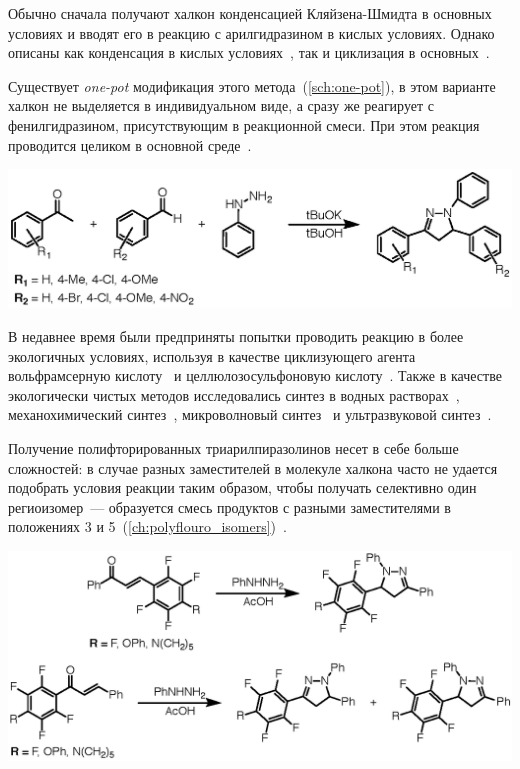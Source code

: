 Обычно сначала получают халкон конденсацией Кляйзена-Шмидта в основных условиях и вводят его в реакцию с арилгидразином в кислых условиях.
Однако описаны как конденсация в кислых условиях~\cite{Wang2010, Nielsen}, так и циклизация в основных~\cite{Munawar2008, Neudorfer2014, Manyem2007, Patel2004, Singh2014}.

Существует \emph{one-pot} модификация этого метода~(\ref{sch:one-pot}), в этом варианте халкон не выделяется в индивидуальном виде, а сразу же реагирует с фенилгидразином, присутствующим в реакционной смеси.
При этом реакция проводится целиком в основной среде~\cite{Farooq2020}.

\begin{scheme}[h!]
    \centering
    \includegraphics{sections/literature/img/one-pot.eps}
    \caption{}
    \label{sch:one-pot}
\end{scheme}

В недавнее время были предприняты попытки проводить реакцию в более экологичных условиях, используя в качестве циклизующего агента вольфрамсерную кислоту~\cite{Rahmatzadeh2015} и целлюлозосульфоновую кислоту~\cite{Daneshfar2015}.
Также в качестве экологически чистых методов исследовались синтез в водных растворах~\cite{Markovic2015}, механохимический синтез~\cite{Zangade2013}, микроволновый синтез~\cite{Adhikari2012} и ультразвуковой синтез~\cite{Shelke2012}.

Получение полифторированных триарилпиразолинов несет в себе больше сложностей: в случае разных заместителей в молекуле халкона часто не удается подобрать условия реакции таким образом, чтобы получать селективно один региоизомер~--- образуется смесь продуктов с разными заместителями в положениях 3 и 5~(\ref{ch:polyflouro_isomers})~\cite{2010}.

\begin{scheme}[h!]
    \centering
    \includegraphics{sections/literature/img/polyflouro_isomers.eps}
    \caption{}
    \label{sch:polyflouro_isomers}
\end{scheme}

